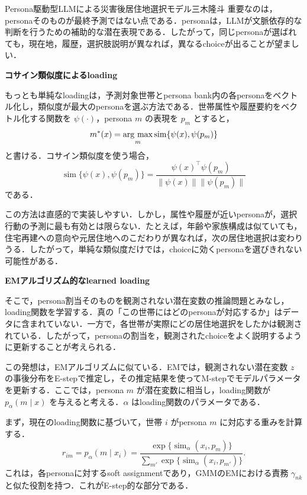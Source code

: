 \begin{column}{Persona駆動型LLMによる災害後居住地選択モデル}{三木隆斗}
重要なのは，personaそのものが最終予測ではない点である．personaは，LLMが文脈依存的な判断を行うための補助的な潜在表現である．したがって，同じpersonaが選ばれても，現在地，履歴，選択肢説明が異なれば，異なるchoiceが出ることが望ましい．

\medskip
\noindent
\textbf{コサイン類似度によるloading}

もっとも単純なloadingは，予測対象世帯とpersona bank内の各personaをベクトル化し，類似度が最大のpersonaを選ぶ方法である．世帯属性や履歴要約をベクトル化する関数を \(\psi(\cdot)\)，persona \(m\) の表現を \(p_m\) とすると，
\begin{equation}
m^*(x)
=
\mathop{\rm arg~max}\limits_m
\operatorname{sim}\{\psi(x),\psi(p_m)\}
\end{equation}
と書ける．コサイン類似度を使う場合，
\begin{equation}
\operatorname{sim}\{\psi(x),\psi(p_m)\}
=
\frac{\psi(x)^\top \psi(p_m)}
{\|\psi(x)\|\|\psi(p_m)\|}
\end{equation}
である．

この方法は直感的で実装しやすい．しかし，属性や履歴が近いpersonaが，選択行動の予測に最も有効とは限らない．たとえば，年齢や家族構成は似ていても，住宅再建への意向や元居住地へのこだわりが異なれば，次の居住地選択は変わりうる．したがって，単純な類似度だけでは，choiceに効くpersonaを選びきれない可能性がある．

\medskip
\noindent
\textbf{EMアルゴリズム的なlearned loading}

そこで，persona割当そのものを観測されない潜在変数の推論問題とみなし，loading関数を学習する．真の「この世帯にはどのpersonaが対応するか」はデータに含まれていない．一方で，各世帯が実際にどの居住地選択をしたかは観測されている．したがって，personaの割当を，観測されたchoiceをよく説明するように更新することが考えられる．

この発想は，EMアルゴリズムに似ている．EMでは，観測されない潜在変数 \(z\) の事後分布をE-stepで推定し，その推定結果を使ってM-stepでモデルパラメータを更新する．ここでは，persona \(m\) が潜在変数に相当し，loading関数が \(p_\alpha(m\mid x)\) を与えると考える．\(\alpha\) はloading関数のパラメータである．

まず，現在のloading関数に基づいて，世帯 \(i\) がpersona \(m\) に対応する重みを計算する．
\begin{equation}
r_{im}
=
p_\alpha(m\mid x_i)
=
\frac{\exp\{\operatorname{sim}_\alpha(x_i,p_m)\}}
{\sum_{m'}\exp\{\operatorname{sim}_\alpha(x_i,p_{m'})\}}.
\end{equation}
これは，各personaに対するsoft assignmentであり，GMMのEMにおける責務 \(\gamma_{nk}\) と似た役割を持つ．これがE-step的な部分である．


\end{column}

